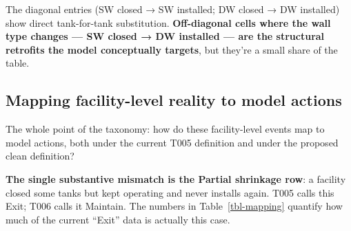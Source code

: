 \documentclass[
  11pt,
]{article}
\begin{document}
The diagonal entries (SW closed → SW installed; DW closed → DW
installed) show direct tank-for-tank substitution. \textbf{Off-diagonal
cells where the wall type changes --- SW closed → DW installed --- are
the structural retrofits the model conceptually targets}, but they're a
small share of the table.

\subsection{Mapping facility-level reality to model
actions}\label{sec-closure-mapping}

The whole point of the taxonomy: how do these facility-level events map
to model actions, both under the current T005 definition and under the
proposed clean definition?

\begin{table}

\caption{\label{tbl-mapping}Mapping of facility-level closure outcomes
to model actions. T005 column shows the current (04b) classification;
Clean column shows the proposed (T006) classification per the user's
plain-English definitions. Mismatches are highlighted.}


\end{table}%

\textbf{The single substantive mismatch is the Partial shrinkage row}: a
facility closed some tanks but kept operating and never installs again.
T005 calls this Exit; T006 calls it Maintain. The numbers in
Table~\ref{tbl-mapping} quantify how much of the current ``Exit'' data
is actually this case.
\end{document}
